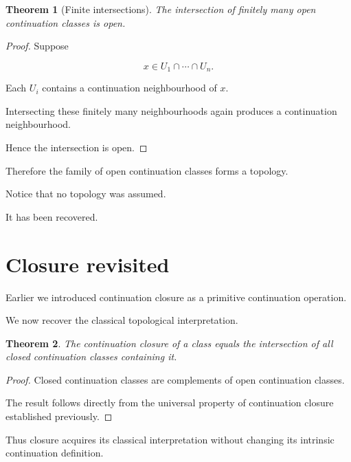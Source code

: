 \documentclass[13pt,openany]{book}
\theoremstyle{plain}
\newtheorem{theorem}{Theorem}[chapter]
\theoremstyle{definition}
\begin{document}
\begin{theorem}[Finite intersections]

The intersection of finitely many open continuation classes is open.
\end{theorem}

\begin{proof}

Suppose

\[
x\in U_1\cap\cdots\cap U_n .
\]

Each $U_i$ contains a continuation neighbourhood of $x$.

Intersecting these finitely many neighbourhoods again produces a continuation neighbourhood.

Hence the intersection is open.

\end{proof}

Therefore the family of open continuation classes forms a topology.

Notice that no topology was assumed.

It has been recovered.

\section{Closure revisited}

Earlier we introduced continuation closure as a primitive continuation operation.

We now recover the classical topological interpretation.

\begin{theorem}

The continuation closure of a class equals the intersection of all closed continuation classes containing it.

\end{theorem}

\begin{proof}

Closed continuation classes are complements of open continuation classes.

The result follows directly from the universal property of continuation closure established previously.

\end{proof}

Thus closure acquires its classical interpretation without changing its intrinsic continuation definition.
\end{document}
